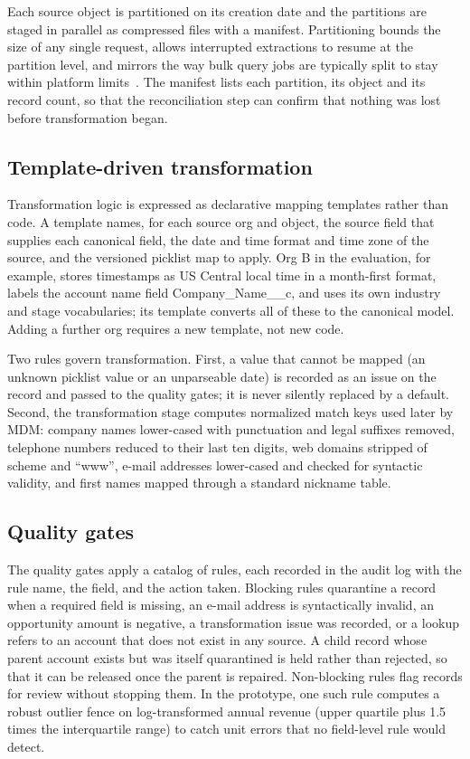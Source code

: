 Each source object is partitioned on its creation date and the partitions are staged in parallel as compressed files with a manifest. Partitioning bounds the size of any single request, allows interrupted extractions to resume at the partition level, and mirrors the way bulk query jobs are typically split to stay within platform limits~\cite{salesforce2026bulk}. The manifest lists each partition, its object and its record count, so that the reconciliation step can confirm that nothing was lost before transformation began.

\subsection{Template-driven transformation}\label{sec:3.3}

Transformation logic is expressed as declarative mapping templates rather than code. A template names, for each source org and object, the source field that supplies each canonical field, the date and time format and time zone of the source, and the versioned picklist map to apply. Org B in the evaluation, for example, stores timestamps as US Central local time in a month-first format, labels the account name field Company\_Name\_\_c, and uses its own industry and stage vocabularies; its template converts all of these to the canonical model. Adding a further org requires a new template, not new code.

Two rules govern transformation. First, a value that cannot be mapped (an unknown picklist value or an unparseable date) is recorded as an issue on the record and passed to the quality gates; it is never silently replaced by a default. Second, the transformation stage computes normalized match keys used later by MDM: company names lower-cased with punctuation and legal suffixes removed, telephone numbers reduced to their last ten digits, web domains stripped of scheme and ``www'', e-mail addresses lower-cased and checked for syntactic validity, and first names mapped through a standard nickname table.

\subsection{Quality gates}\label{sec:3.4}

The quality gates apply a catalog of rules, each recorded in the audit log with the rule name, the field, and the action taken. Blocking rules quarantine a record when a required field is missing, an e-mail address is syntactically invalid, an opportunity amount is negative, a transformation issue was recorded, or a lookup refers to an account that does not exist in any source. A child record whose parent account exists but was itself quarantined is held rather than rejected, so that it can be released once the parent is repaired. Non-blocking rules flag records for review without stopping them. In the prototype, one such rule computes a robust outlier fence on log-transformed annual revenue (upper quartile plus 1.5 times the interquartile range) to catch unit errors that no field-level rule would detect.

